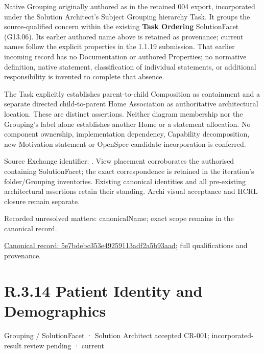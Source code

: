 Native Grouping originally authored as \texttt{} in the retained 004 export,
incorporated under the Solution Architect's Subject Grouping hierarchy Task.
It groups the source-qualified \texttt{} concern within
the existing \textbf{Task Ordering} SolutionFacet (G13.06). Its earlier authored name above is retained as provenance; current names
follow the explicit properties in the 1.1.19 submission.
That earlier incoming record has no Documentation or authored Properties; no normative
definition, native statement, classification of individual statements, or
additional responsibility is invented to complete that absence.



The Task explicitly establishes parent-to-child Composition as containment and
a separate directed child-to-parent Home Association as authoritative architectural
location. These are distinct assertions. Neither diagram membership nor the
Grouping's label alone establishes another Home or a statement allocation.
No component ownership, implementation dependency, Capability decomposition,
new Motivation statement or OpenSpec candidate incorporation is conferred.



Source Exchange identifier: \texttt{}. View placement corroborates
the authorised containing SolutionFacet; the exact correspondence is retained in the
iteration's folder/Grouping inventories. Existing canonical identities and all
pre-existing architectural assertions retain their standing. Archi visual
acceptance and HCRL closure remain separate.


{\small Recorded unresolved matters: canonicalName; exact scope remains in the canonical record.}\par
{\footnotesize \href{../../../../../../../continuum/grouping/5e7bdebc353e49259113adf2a5b93aad.md}{Canonical record: 5e7bdebc353e49259113adf2a5b93aad}; full qualifications and provenance.}\par
\section*{R.3.14 Patient Identity and Demographics}
\label{navigation:R.3.14}

\label{element:a9deca9adbb443208d6f08dbe4505717}
{\small Grouping / SolutionFacet · Solution Architect accepted CR-001; incorporated-result review pending · current}\par

